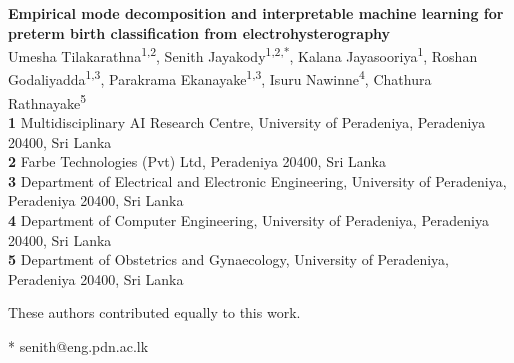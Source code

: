 \documentclass[10pt,letterpaper]{article}
\begin{document}
\vspace*{0.2in}

\begin{flushleft}
{\Large 
\textbf{Empirical mode decomposition and interpretable machine learning for preterm birth classification from electrohysterography} %
}
\newline
\\
Umesha Tilakarathna\textsuperscript{1,2\Yinyang},
Senith Jayakody\textsuperscript{1,2\Yinyang,*},
Kalana Jayasooriya\textsuperscript{1},
Roshan Godaliyadda\textsuperscript{1,3},
Parakrama Ekanayake\textsuperscript{1,3},
Isuru Nawinne\textsuperscript{4},
Chathura Rathnayake\textsuperscript{5}
\\
\bigskip
\textbf{1} Multidisciplinary AI Research Centre, University of Peradeniya, Peradeniya 20400, Sri Lanka
\\
\textbf{2} Farbe Technologies (Pvt) Ltd, Peradeniya 20400, Sri Lanka
\\
\textbf{3} Department of Electrical and Electronic Engineering, University of Peradeniya, Peradeniya 20400, Sri Lanka
\\
\textbf{4} Department of Computer Engineering, University of Peradeniya, Peradeniya 20400, Sri Lanka
\\
\textbf{5} Department of Obstetrics and Gynaecology, University of Peradeniya, Peradeniya 20400, Sri Lanka
\\
\bigskip

% 
%
\Yinyang These authors contributed equally to this work.





* senith@eng.pdn.ac.lk

\end{flushleft}
\end{document}
